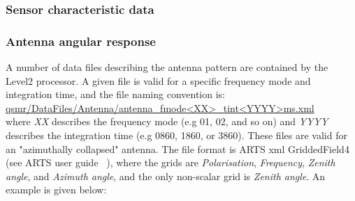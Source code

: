 \subsubsection{Sensor characteristic data}

\subsubsection*{Antenna angular response}

A number of data files describing the antenna pattern
are contained by the Level2 processor.
A given file is valid for a specific frequency mode and integration
time, and the file naming convention is:\\
\url{qsmr/DataFiles/Antenna/antenna_fmode<XX>_tint<YYYY>ms.xml}\\
where \emph{XX} describes the frequency mode (e.g 01, 02, and so on)
and \emph{YYYY} describes the integration time (e.g 0860, 1860, or 3860).
These files are valid for an "azimuthally collapsed"
antenna. The file format is ARTS xml GriddedField4 (see ARTS user guide ~\citep{artsug}),
where the grids are \emph{Polarisation}, \emph{Frequency}, \emph{Zenith angle},
and \emph{Azimuth angle}, and the only non-scalar grid is \emph{Zenith angle}.
An example is given below:


